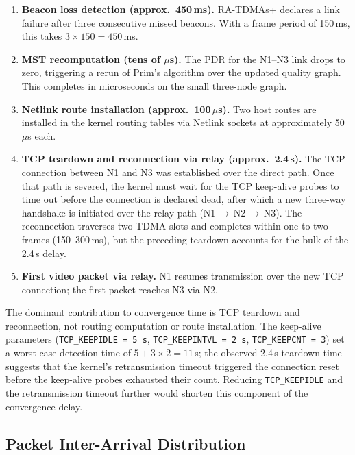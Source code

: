 \begin{enumerate}
  \item \textbf{Beacon loss detection (approx.\ 450\,ms).}
  RA-TDMAs+ declares a link failure after three consecutive missed beacons.
  With a frame period of 150\,ms, this takes $3 \times 150 = 450$\,ms.

  \item \textbf{MST recomputation (tens of $\mu$s).}
  The PDR for the N1--N3 link drops to zero, triggering a rerun of Prim's
  algorithm over the updated quality graph. This completes in microseconds
  on the small three-node graph.

  \item \textbf{Netlink route installation (approx.\ 100\,$\mu$s).}
  Two host routes are installed in the kernel routing tables via Netlink
  sockets at approximately 50\,$\mu$s each.

  \item \textbf{TCP teardown and reconnection via relay (approx.\ 2.4\,s).}
  The TCP connection between N1 and N3 was established over the direct path.
  Once that path is severed, the kernel must wait for the TCP keep-alive
  probes to time out before the connection is declared dead, after which
  a new three-way handshake is initiated over the relay path
  (N1\,$\to$\,N2\,$\to$\,N3). The reconnection traverses two TDMA slots
  and completes within one to two frames (150--300\,ms), but the preceding
  teardown accounts for the bulk of the 2.4\,s delay.

  \item \textbf{First video packet via relay.}
  N1 resumes transmission over the new TCP connection; the first packet
  reaches N3 via N2.
\end{enumerate}

The dominant contribution to convergence time is TCP teardown and
reconnection, not routing computation or route installation. The
keep-alive parameters (\texttt{TCP\_KEEPIDLE = 5\,s},
\texttt{TCP\_KEEPINTVL = 2\,s}, \texttt{TCP\_KEEPCNT = 3}) set a
worst-case detection time of $5 + 3 \times 2 = 11$\,s; the observed
2.4\,s teardown time suggests that the kernel's retransmission timeout
triggered the connection reset before the keep-alive probes exhausted
their count. Reducing \texttt{TCP\_KEEPIDLE} and the retransmission
timeout further would shorten this component of the convergence delay.

\subsection{Packet Inter-Arrival Distribution}
\label{subsec:res-ia}

